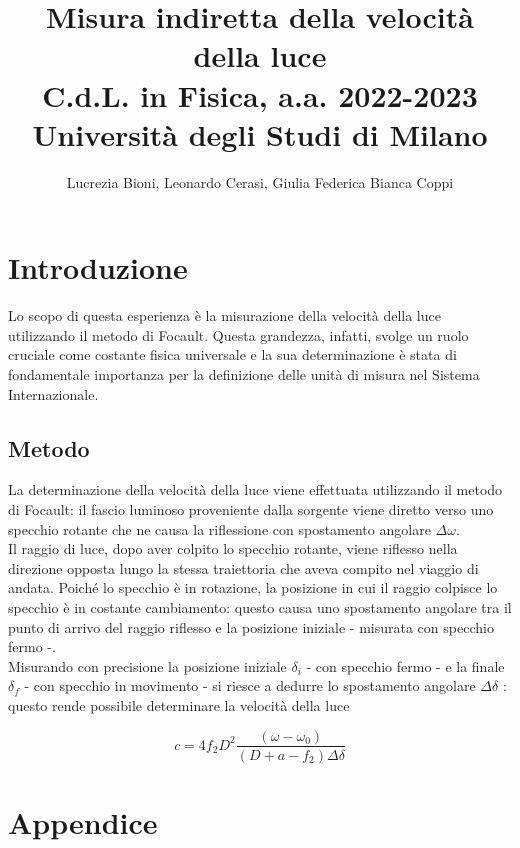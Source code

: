 \documentclass[]{article}
\title{%
    \Huge Misura indiretta della velocità della luce \\
    \Large C.d.L. in Fisica, a.a. 2022-2023 \\ Università degli Studi di Milano}
\author{\LARGE Lucrezia Bioni, Leonardo Cerasi, Giulia Federica Bianca Coppi}
\date{}
\let\oldsection\section%
\renewcommand{\section}{%
	\renewcommand{\theequation}{\thesection.\arabic{equation}}%
	\oldsection}%
\let\oldsubsection\subsection%
\renewcommand{\subsection}{%
	\renewcommand{\theequation}{\thesubsection.\arabic{equation}}%
	\oldsubsection}%
\begin{document}
    \maketitle

    \section{Introduzione}

    Lo scopo di questa esperienza è la misurazione della velocità della luce utilizzando 
    il metodo di Focault. Questa grandezza, infatti, svolge un ruolo cruciale come costante 
    fisica universale e la sua determinazione è stata di fondamentale importanza per la definizione 
    delle unità di misura nel Sistema Internazionale.

    \subsection{Metodo}
    
    La determinazione della velocità della luce viene effettuata utilizzando il metodo di Focault: 
    il fascio luminoso proveniente dalla sorgente viene diretto verso uno specchio rotante che ne causa
     la riflessione con spostamento angolare $    \Delta\omega  $.\\
     Il raggio di luce, dopo aver colpito lo specchio rotante, viene riflesso nella direzione opposta lungo 
     la stessa traiettoria che aveva compito nel viaggio di andata. Poiché lo specchio è in rotazione, 
     la posizione in cui il raggio colpisce lo specchio è in costante cambiamento: questo causa uno spostamento
      angolare tra il punto di arrivo del raggio riflesso e la posizione iniziale - misurata con specchio fermo -.\\
      Misurando con precisione la posizione iniziale $ \delta _i $ - con specchio fermo - e la finale  $ \delta _f $ - con specchio in movimento - 
      si riesce a dedurre lo spostamento angolare $ \Delta \delta $ : questo rende possibile determinare la velocità della luce 

    \begin{equation}
    \label{eqn:c}
    c=4f_2D^2
    \frac{(\omega -\omega_0)}{(D+a-f_2)\Delta \delta }
    \end{equation}

    \section{Appendice}
\end{document}
